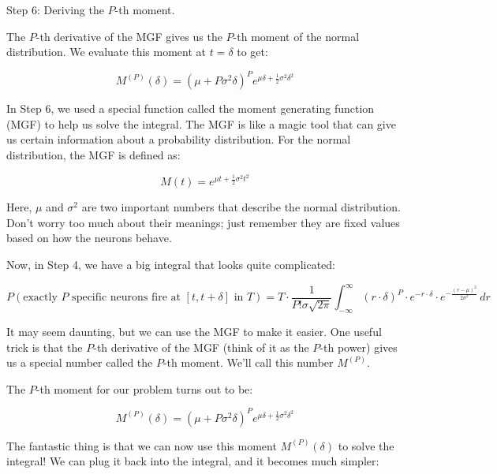 Step 6: Deriving the \( P \)-th moment.

The \( P \)-th derivative of the MGF gives us the \( P \)-th moment of the normal distribution. We evaluate this moment at \( t = \delta \) to get:

\begin{equation}
M^{(P)}(\delta) = (\mu + P\sigma^2\delta)^P e^{\mu\delta + \frac{1}{2}\sigma^2 \delta^2}
\end{equation}

In Step 6, we used a special function called the moment generating function (MGF) to help us solve the integral. The MGF is like a magic tool that can give us certain information about a probability distribution. For the normal distribution, the MGF is defined as:

\begin{equation}
M(t) = e^{\mu t + \frac{1}{2}\sigma^2 t^2}
\end{equation}

Here, \(\mu\) and \(\sigma^2\) are two important numbers that describe the normal distribution. Don't worry too much about their meanings; just remember they are fixed values based on how the neurons behave.

Now, in Step 4, we have a big integral that looks quite complicated:

\begin{equation}
P(\text{exactly } P \text{ specific neurons fire at } [t, t + \delta] \text{ in } T) = T \cdot \frac{1}{P! \sigma \sqrt{2\pi}} \int_{-\infty}^{\infty} (r \cdot \delta)^P \cdot e^{-r \cdot \delta} \cdot e^{-\frac{(r-\mu)^2}{2\sigma^2}} \, dr
\end{equation}

It may seem daunting, but we can use the MGF to make it easier. One useful trick is that the \(P\)-th derivative of the MGF (think of it as the \(P\)-th power) gives us a special number called the \(P\)-th moment. We'll call this number \(M^{(P)}\).

The \(P\)-th moment for our problem turns out to be:

\begin{equation}
M^{(P)}(\delta) = (\mu + P\sigma^2\delta)^P e^{\mu\delta + \frac{1}{2}\sigma^2 \delta^2}
\end{equation}

The fantastic thing is that we can now use this moment \(M^{(P)}(\delta)\) to solve the integral! We can plug it back into the integral, and it becomes much simpler:

